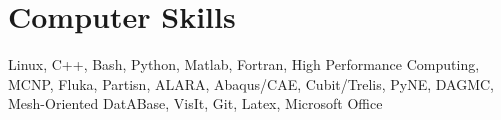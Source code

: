 %
%
\section{Computer Skills}
Linux, C++, Bash, Python, Matlab, Fortran, 
High Performance Computing,
MCNP, Fluka, Partisn, ALARA, 
Abaqus/CAE, Cubit/Trelis, 
PyNE, DAGMC, Mesh-Oriented DatABase, 
VisIt, 
Git, Latex, Microsoft Office 
